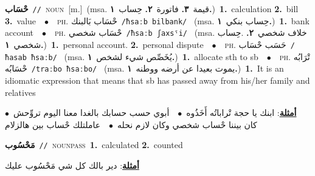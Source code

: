 \documentclass[10pt,a4paper,twoside]{article} %
\begin{document}
\begin{multicols}{2}
{\setlength\topsep{0pt}\textbf{\foreignlanguage{arabic}{حْسَاب}}\ {\color{gray}\texttt{//}\color{black}}\ \textsc{noun}\ [m.]\ \color{gray}(msa. \foreignlanguage{arabic}{قيمة}~\foreignlanguage{arabic}{\textbf{٣.}}  \foreignlanguage{arabic}{فاتورة}~\foreignlanguage{arabic}{\textbf{٢.}}  \foreignlanguage{arabic}{حِساب}~\foreignlanguage{arabic}{\textbf{١.}})\color{black}\ \textbf{1.}~calculation  \textbf{2.}~bill  \textbf{3.}~value\ \ $\bullet$\ \ \textsc{ph.} \color{gray} \foreignlanguage{arabic}{حْسَاب بَالبنك}\color{black}\ {\color{gray}\texttt{/{\sffamily ħsaːb bilbank}/}\color{black}}\ \color{gray} (msa. \foreignlanguage{arabic}{حِساب بنكي}~\foreignlanguage{arabic}{\textbf{١.}})\color{black}\ \textbf{1.}~bank account\ \ $\bullet$\ \ \textsc{ph.} \color{gray} \foreignlanguage{arabic}{حْسَاب شخصي}\color{black}\ {\color{gray}\texttt{/{\sffamily ħsaːb ʃaxsˤi}/}\color{black}}\ \color{gray} (msa. \foreignlanguage{arabic}{خلاف شخصي}~\foreignlanguage{arabic}{\textbf{٢.}}  .\foreignlanguage{arabic}{حِساب شخصي}~\foreignlanguage{arabic}{\textbf{١.}})\color{black}\ \textbf{1.}~personal account.  \textbf{2.}~personal dispute\ \ $\bullet$\ \ \textsc{ph.} \color{gray} \foreignlanguage{arabic}{حَسَب حْسَاب}\color{black}\ {\color{gray}\texttt{/{\sffamily ħasab ħsaːb}/}\color{black}}\ \color{gray} (msa. \foreignlanguage{arabic}{يُخَصِّص شيء لشخص}~\foreignlanguage{arabic}{\textbf{١.}})\color{black}\ \textbf{1.}~allocate sth to sb\ \ $\bullet$\ \ \textsc{ph.} \color{gray} \foreignlanguage{arabic}{تْرَابُه حْسَابُه}\color{black}\ {\color{gray}\texttt{/{\sffamily traːbo ħsaːbo}/}\color{black}}\ \color{gray} (msa. \foreignlanguage{arabic}{يموت بعيدا عن أرضه ووطنه}~\foreignlanguage{arabic}{\textbf{١.}})\color{black}\ \textbf{1.}~It is an idiomatic expression that means that sb has passed away from his/her family and relatives\  \begin{flushright}\color{gray}\foreignlanguage{arabic}{\textbf{\underline{\foreignlanguage{arabic}{أمثلة}}}: ابنك يا حجة تْراباتُه أَخَذُوه\ $\bullet$\ \  أبوي حسب حسابك بالغدا معنا اليوم تروِّحش\ $\bullet$\ \  كان بيننا حْساب شخصي وكان لازم نحله\ $\bullet$\ \  عاملتلك حْساب بين هالزلام}\end{flushright}\color{black}} \vspace{2mm}

{\setlength\topsep{0pt}\textbf{\foreignlanguage{arabic}{مَحْسُوب}}\ {\color{gray}\texttt{//}\color{black}}\ \textsc{noun\textunderscore pass}\ \textbf{1.}~calculated  \textbf{2.}~counted\  \begin{flushright}\color{gray}\foreignlanguage{arabic}{\textbf{\underline{\foreignlanguage{arabic}{أمثلة}}}: دير بالك كل شي مَحْسُوب عليك}\end{flushright}\color{black}} \vspace{2mm}


\end{multicols}
\end{document}
